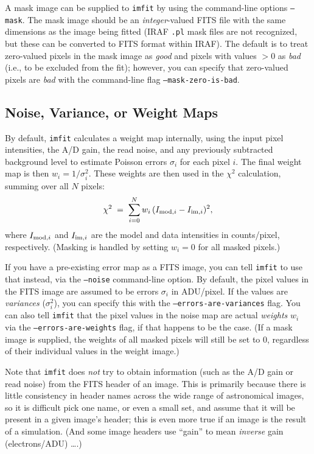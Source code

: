 \documentclass[10pt]{article}
\newcommand{\imfit}{\texttt{imfit}}
\begin{document}
A mask image can be supplied to \imfit{} by using the command-line
options \texttt{--mask}. The mask image should be an \textit{integer}-valued
FITS file with the same dimensions as the image being fitted (IRAF \texttt{.pl}
mask files are not recognized, but these can be converted to FITS format within
IRAF). The default is to treat zero-valued pixels in the mask image as
\textit{good} and pixels with values $> 0$ as \textit{bad} (i.e., to be excluded
from the fit); however, you can specify that zero-valued pixels are \textit{bad}
with the command-line flag \texttt{--mask-zero-is-bad}.



\subsection{Noise, Variance, or Weight Maps}

By default, \imfit{} calculates a weight map internally, using the input pixel
intensities, the A/D gain, the read noise, and any previously subtracted
background level to estimate Poisson errors $\sigma_{i}$ for each pixel $i$. The
final weight map is then $w_{i} = 1/\sigma^{2}_{i}$. These weights are then used in the 
$\chi^2$ calculation, summing over all $N$ pixels:
\begin{equation}
\chi^2 \; = \; \sum_{i = 0}^{N} w_{i} \, (I_{{\rm mod}, i} - I_{{\rm im}, i})^2 ,
\end{equation}
where $I_{{\rm mod}, i}$ and $I_{{\rm im}, i}$ are the model and data intensities
in counts/pixel, respectively. (Masking is handled by setting $w_{i} = 0$
for all masked pixels.)

If you have a pre-existing error map as a FITS image, you can tell \imfit{} to
use that instead, via the \texttt{--noise} command-line option. By default, the
pixel values in the FITS image are assumed to be errors $\sigma_{i}$ in
ADU/pixel. If the values are \textit{variances} ($\sigma_{i}^2$), you can specify
this with the \texttt{--errors-are-variances} flag. You can also tell \imfit{}
that the pixel values in the noise map are actual \textit{weights} $w_{i}$ via the
\texttt{--errors-are-weights} flag, if that happens to be the case. (If a mask
image is supplied, the weights of all masked pixels will still be set to 0,
regardless of their individual values in the weight image.)

Note that \imfit{} does \textit{not} try to obtain information (such as
the A/D gain or read noise) from the FITS header of an image. This is primarily
because there is little consistency in header names across the wide range of
astronomical images, so it is difficult pick one name, or even a small set, and
assume that it will be present in a given image's header; this is even more
true if an image is the result of a simulation. (And some image headers
use ``gain'' to mean \textit{inverse} gain (electrons/ADU) \ldots.)
\end{document}
